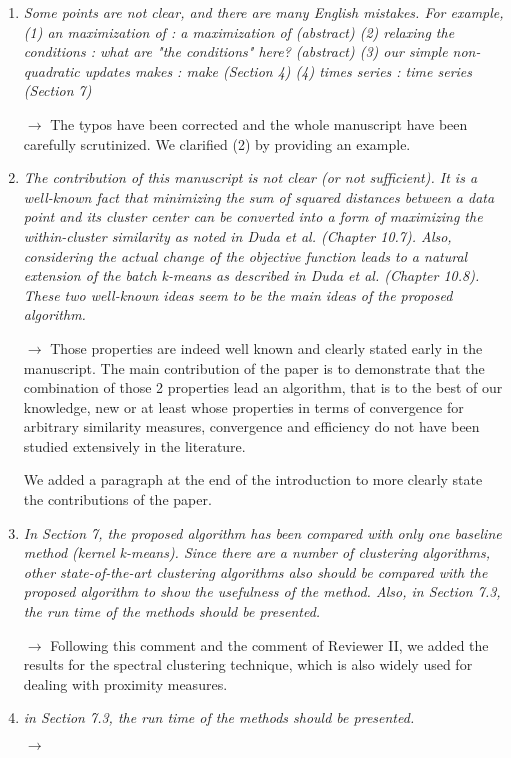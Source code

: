 \documentclass[10pt]{article}
\begin{document}
\begin{enumerate}

\item \emph{Some points are not clear, and there are many English mistakes. For example,
(1) an maximization of : a maximization of (abstract)
(2) relaxing the conditions : what are "the conditions" here? (abstract)
(3) our simple non-quadratic updates makes : make (Section 4)
(4) times series : time series (Section 7)}

$\rightarrow$ The typos have been corrected and the whole manuscript have been carefully scrutinized. We clarified (2) by providing an example.

\item \emph{The contribution of this manuscript is not clear (or not sufficient). It is a well-known fact that minimizing the sum of squared distances between a data point and its cluster center can be converted into a form of maximizing the within-cluster similarity as noted in Duda et al. (Chapter 10.7). Also, considering the actual change of the objective function leads to a natural extension of the batch k-means as described in Duda et al. (Chapter 10.8). These two well-known ideas seem to be the main ideas of the proposed algorithm.}

$\rightarrow$ Those properties are indeed well known and clearly stated early in the manuscript. The main contribution of the paper is to demonstrate that the combination of those 2 properties lead an algorithm, that is to the best of our knowledge, new or at least whose properties in terms of convergence for arbitrary similarity measures, convergence and efficiency do not have been studied extensively in the literature.

We added a paragraph at the end of the introduction to more clearly state the contributions of the paper.

\item \emph{In Section 7, the proposed algorithm has been compared with only one baseline method (kernel k-means). Since there are a number of clustering algorithms, other state-of-the-art clustering algorithms also should be compared with the proposed algorithm to show the usefulness of the method. Also, in Section 7.3, the run time of the methods should be presented.}

$\rightarrow$ Following this comment and the comment of Reviewer II, we added the results for the spectral clustering technique, which is also widely used for dealing with proximity measures.

\item \emph{in Section 7.3, the run time of the methods should be presented.}

$\rightarrow$

\end{enumerate}
\end{document}
